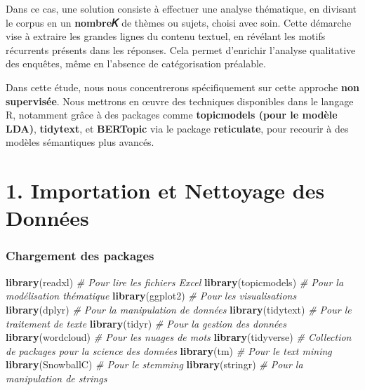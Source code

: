 \documentclass[
]{article}
\newenvironment{Shaded}{\begin{snugshade}}{\end{snugshade}}
\newcommand{\CommentTok}[1]{\textcolor[rgb]{0.56,0.35,0.01}{\textit{#1}}}
\newcommand{\FunctionTok}[1]{\textcolor[rgb]{0.13,0.29,0.53}{\textbf{#1}}}
\newcommand{\NormalTok}[1]{#1}
\begin{document}
Dans ce cas, une solution consiste à effectuer une analyse thématique,
en divisant le corpus en un \textbf{nombre𝐾} de thèmes ou sujets, choisi
avec soin. Cette démarche vise à extraire les grandes lignes du contenu
textuel, en révélant les motifs récurrents présents dans les réponses.
Cela permet d'enrichir l'analyse qualitative des enquêtes, même en
l'absence de catégorisation préalable.

Dans cette étude, nous nous concentrerons spécifiquement sur cette
approche \textbf{non supervisée}. Nous mettrons en œuvre des techniques
disponibles dans le langage R, notamment grâce à des packages comme
\textbf{topicmodels (pour le modèle LDA)}, \textbf{tidytext}, et
\textbf{BERTopic} via le package \textbf{reticulate}, pour recourir à
des modèles sémantiques plus avancés.

\newpage

\section{1. Importation et Nettoyage des Données}\label{sec:importation}

\subsubsection{Chargement des packages}\label{chargement-des-packages}

\begin{Shaded}
\begin{Highlighting}[]
\FunctionTok{library}\NormalTok{(readxl)       }\CommentTok{\# Pour lire les fichiers Excel}
\FunctionTok{library}\NormalTok{(topicmodels)  }\CommentTok{\# Pour la modélisation thématique}
\FunctionTok{library}\NormalTok{(ggplot2)      }\CommentTok{\# Pour les visualisations}
\FunctionTok{library}\NormalTok{(dplyr)        }\CommentTok{\# Pour la manipulation de données}
\FunctionTok{library}\NormalTok{(tidytext)     }\CommentTok{\# Pour le traitement de texte}
\FunctionTok{library}\NormalTok{(tidyr)        }\CommentTok{\# Pour la gestion des données}
\FunctionTok{library}\NormalTok{(wordcloud)    }\CommentTok{\# Pour les nuages de mots}
\FunctionTok{library}\NormalTok{(tidyverse)    }\CommentTok{\# Collection de packages pour la science des données}
\FunctionTok{library}\NormalTok{(tm)           }\CommentTok{\# Pour le text mining}
\FunctionTok{library}\NormalTok{(SnowballC)    }\CommentTok{\# Pour le stemming}
\FunctionTok{library}\NormalTok{(stringr)      }\CommentTok{\# Pour la manipulation de strings}
\end{Highlighting}
\end{Shaded}
\end{document}
